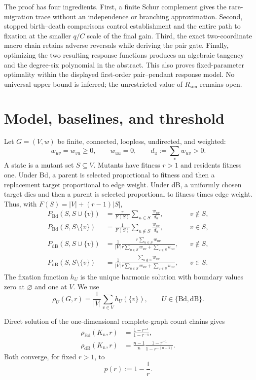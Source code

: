 \documentclass[11pt]{article}
\theoremstyle{definition}
\theoremstyle{remark}
\newcommand{\Bd}{\mathrm{Bd}}
\newcommand{\dB}{\mathrm{dB}}
\newcommand{\Rsim}{R_{\mathrm{sim}}}
\begin{document}
The proof has four ingredients.  First, a finite Schur complement gives the
rare-migration trace without an independence or branching approximation.
Second, stopped birth--death comparisons control establishment and the
entire path to fixation at the smaller $q/C$ scale of the final gain.  Third,
the exact two-coordinate macro chain retains adverse reversals while deriving
the pair gate.  Finally, optimizing the two resulting response functions
produces an algebraic tangency and the degree-six polynomial in the abstract.
This also proves fixed-parameter optimality within the displayed first-order
pair--pendant response model.  No universal upper bound is inferred; the
unrestricted value of $\Rsim$ remains open.

\section{Model, baselines, and threshold}

Let $G=(V,w)$ be finite, connected, loopless, undirected, and weighted:
\[
 w_{uv}=w_{vu}\geq0,\qquad w_{uu}=0,\qquad
 d_u:=\sum_vw_{uv}>0.
\]
A state is a mutant set $S\subseteq V$.  Mutants have fitness $r>1$ and
residents fitness one.  Under Bd, a parent is selected proportional to
fitness and then a replacement target proportional to edge weight.  Under
dB, a uniformly chosen target dies and then a parent is selected
proportional to fitness times edge weight.  Thus, with
$F(S)=|V|+(r-1)|S|$,
\begin{align}
 P_{\Bd}(S,S\cup\{v\})
 &=\frac r{F(S)}\sum_{u\in S}\frac{w_{uv}}{d_u},
 &&v\notin S,\\
 P_{\Bd}(S,S\setminus\{v\})
 &=\frac1{F(S)}\sum_{u\notin S}\frac{w_{uv}}{d_u},
 &&v\in S,\\
 P_{\dB}(S,S\cup\{v\})
 &=\frac1{|V|}
 \frac{r\sum_{u\in S}w_{uv}}
 {r\sum_{u\in S}w_{uv}+\sum_{u\notin S}w_{uv}},
 &&v\notin S,\\
 P_{\dB}(S,S\setminus\{v\})
 &=\frac1{|V|}
 \frac{\sum_{u\notin S}w_{uv}}
 {r\sum_{u\in S}w_{uv}+\sum_{u\notin S}w_{uv}},
 &&v\in S.
\end{align}
The fixation function $h_U$ is the unique harmonic solution with boundary
values zero at $\varnothing$ and one at $V$.  We use
\[
 \rho_U(G,r)=\frac1{|V|}\sum_{v\in V}h_U(\{v\}),
 \qquad U\in\{\Bd,\dB\}.
\]

Direct solution of the one-dimensional complete-graph count chains gives
\begin{align}
 \rho_{\Bd}(K_n,r)
 &=\frac{1-r^{-1}}{1-r^{-n}},\\
 \rho_{\dB}(K_n,r)
 &=\frac{n-1}{n}\frac{1-r^{-1}}{1-r^{-(n-1)}}.
\end{align}
Both converge, for fixed $r>1$, to
\[
 p(r):=1-\frac1r.
\]
\end{document}

